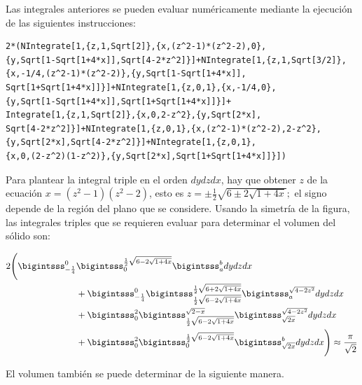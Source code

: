 Las integrales anteriores se pueden evaluar numéricamente mediante la ejecución de las siguientes instrucciones:

\begin{tcolorbox}[title=\bf Instrucción en \verb"Mathematica"]\begin{Verbatim}[formatcom=\letraverbatim]
2*(NIntegrate[1,{z,1,Sqrt[2]},{x,(z^2-1)*(z^2-2),0},
{y,Sqrt[1-Sqrt[1+4*x]],Sqrt[4-2*z^2]}]+NIntegrate[1,{z,1,Sqrt[3/2]},
{x,-1/4,(z^2-1)*(z^2-2)},{y,Sqrt[1-Sqrt[1+4*x]],
Sqrt[1+Sqrt[1+4*x]]}]+NIntegrate[1,{z,0,1},{x,-1/4,0},
{y,Sqrt[1-Sqrt[1+4*x]],Sqrt[1+Sqrt[1+4*x]]}]+
Integrate[1,{z,1,Sqrt[2]},{x,0,2-z^2},{y,Sqrt[2*x],
Sqrt[4-2*z^2]}]+NIntegrate[1,{z,0,1},{x,(z^2-1)*(z^2-2),2-z^2},
{y,Sqrt[2*x],Sqrt[4-2*z^2]}]+NIntegrate[1,{z,0,1},
{x,0,(2-z^2)(1-z^2)},{y,Sqrt[2*x],Sqrt[1+Sqrt[1+4*x]]}])
\end{Verbatim}
\end{tcolorbox}

Para plantear la integral triple en el orden $dydzdx$, hay que obtener $z$ de la ecuación $x = (z^2-1)(z^2-2)$, esto es
$z = \pm \frac{1}{2} \sqrt{6 \pm 2 \sqrt{1+4x}};$
el signo depende de la región del plano que se considere. Usando la simetría de la figura, las integrales triples que se requieren evaluar para determinar el volumen del sólido son:

\clearpage

\vspace*{-1.4\baselineskip}

\begingroup
\setlength{\abovedisplayskip}{0pt}
\setlength{\abovedisplayshortskip}{0pt}
\begin{align}
2\Bigg( \bigintsss_{-\frac{1}{4}}^{0} & \bigintsss_{0}^{\frac{1}{2}\sqrt{6-2\sqrt{1+4x}}}\bigintsss_{ a }^{b}dydzdx\notag\\
&+\bigintsss_{-\frac{1}{4}}^0 \bigintsss_{\frac{1}{2}\sqrt{6-2\sqrt{1+4x}}}^{\frac{1}{2}\sqrt{6+2\sqrt{1+4x}}}\bigintsss_{ a }^{\sqrt{4-2z^2}}dydzdx\notag\\
&+ \bigintsss_0^2 \bigintsss_{\frac{1}{2}\sqrt{6-2\sqrt{1+4x}}}^{\sqrt{2-x}}\bigintsss_{\sqrt{2x}}^{\sqrt{4-2z^2}}dydzdx\notag\\
&+ \bigintsss_{0}^2\bigintsss_{0}^{\frac{1}{2}\sqrt{6-2\sqrt{1+4x}}} \bigintsss_{\sqrt{2x}}^{b}dydzdx\Bigg) \approx \frac{\pi}{\sqrt{2}}\label{trescilindros1}
\end{align}
\endgroup

El volumen también se puede determinar de la siguiente manera.

